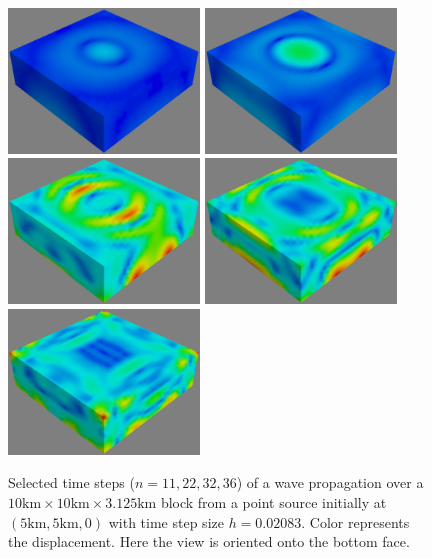 \begin{figure}[t]
\begin{center}
\includegraphics[width=2in]{figures/Wave11}
\includegraphics[width=2in]{figures/Wave22}
\includegraphics[width=2in]{figures/Wave28}
\includegraphics[width=2in]{figures/Wave32}
\includegraphics[width=2in]{figures/Wave36}
\end{center}
\caption{Selected time steps ($n = 11, 22, 32, 36$) of a wave propagation over a $10\mbox{km} \times 10\mbox{km} \times 3.125\mbox{km}$ block 
from a point source initially at $(5\mbox{km},5\mbox{km},0)$
with time step size $h=0.02083$. Color represents the displacement.
Here the view is oriented onto the bottom face.
\label{WAVE FIG 2}}
\end{figure}

